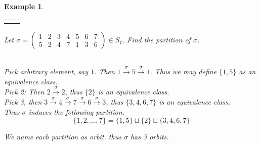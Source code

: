 \documentclass{article}
\theoremstyle{MyNonumberplain}
\theoremstyle{break}
\newcommand{\nline}{\begin{tabular}{ll}&\\\end{tabular}}
\theoremstyle{break}
\newtheorem{example}{Example}[section]
\theoremstyle{break}
\theoremstyle{definition}
\theoremstyle{break}
\begin{document}
\begin{expbox}
    \begin{example}

        \nline

        Let $\sigma = \left(\begin{array}{ccccccc}
        1 & 2 & 3 & 4 & 5 & 6 & 7\\
        5 & 2 & 4 & 7 & 1 & 3 & 6
        \end{array}\right) \in S_7$. Find the partition of $\sigma$.\\\\

        \begin{ansbox}
            Pick arbitrary element, say $1$. Then $1 \xrightarrow{\sigma} 5
            \xrightarrow{\sigma} 1$. Thus we may define $\{ 1, 5 \}$ as an equivalence
            class.\\
            
            Pick 2: Then $2 \xrightarrow{\sigma} 2$, thus $\{ 2 \}$ is an equivalence
            class.\\
            
            Pick 3, then $3 \xrightarrow{\sigma} 4 \xrightarrow{\sigma} 7
            \xrightarrow{\sigma} 6 \xrightarrow{\sigma} 3$, thus $\{ 3, 4, 6, 7 \}$ is an
            equivalence class.\\
            
            Thus $\sigma$ induces the following partition.
            \[ \{ 1, 2, \ldots, 7 \} = \{ 1, 5 \} \sqcup \{ 2 \} \sqcup \{ 3, 4, 6, 7 \}
            \]
    
        \end{ansbox}

        We name each partition as orbit. thus $\sigma$ has 3 orbits.
    \end{example}   
\end{expbox}
\end{document}
